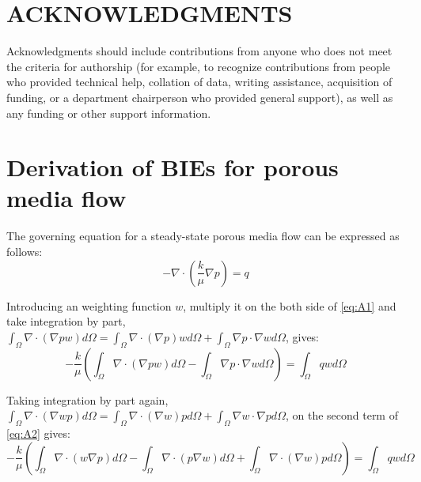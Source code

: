\documentclass[num-refs]{wiley-networks}
\begin{document}
\section*{\normalsize{ACKNOWLEDGMENTS}}
Acknowledgments should include contributions from anyone who does not meet the criteria for authorship (for example, to recognize contributions from people who provided technical help, collation of data, writing assistance, acquisition of funding, or a department chairperson who provided general support), as well as any funding or other support information.


%



\appendix
{} %

\section{Derivation of BIEs for porous media flow}
\label{AppendixA}
The governing equation for a steady-state porous media flow can be expressed as follows:
\begin{equation}
-\nabla \cdot \left( \frac{k}{\mu}\nabla p \right) =q
\label{eq:A1}
\end{equation}

Introducing an weighting function $w$, multiply it on the both side of \eqref{eq:A1} and take integration by part, $\int_{\Omega}{\nabla \cdot \left( \nabla pw \right)}d\Omega =\int_{\Omega}{\nabla \cdot \left( \nabla p \right) wd\Omega}+\int_{\Omega}{\nabla p\cdot \nabla wd\Omega}$, gives:
\begin{equation}
    -\frac{k}{\mu}\left( \int_{\Omega}{\nabla \cdot \left( \nabla pw \right)}d\Omega -\int_{\Omega}{\nabla p\cdot \nabla wd\Omega} \right) =\int_{\Omega}{qwd\Omega}
\label{eq:A2}
\end{equation}

Taking integration by part again, $\int_{\Omega}{\nabla \cdot \left( \nabla wp \right)}d\Omega =\int_{\Omega}{\nabla \cdot \left( \nabla w \right) p}d\Omega +\int_{\Omega}{\nabla w\cdot \nabla pd\Omega}$, on the second term of \eqref{eq:A2} gives:
\begin{equation}
    -\frac{k}{\mu}\left( \int_{\Omega}{\nabla \cdot \left( w\nabla p \right)}d\Omega -\int_{\Omega}{\nabla \cdot \left( p\nabla w \right)}d\Omega +\int_{\Omega}{\nabla \cdot \left( \nabla w \right) pd\Omega} \right) =\int_{\Omega}{qwd\Omega}
\label{eq:A3}
\end{equation}
\end{document}
